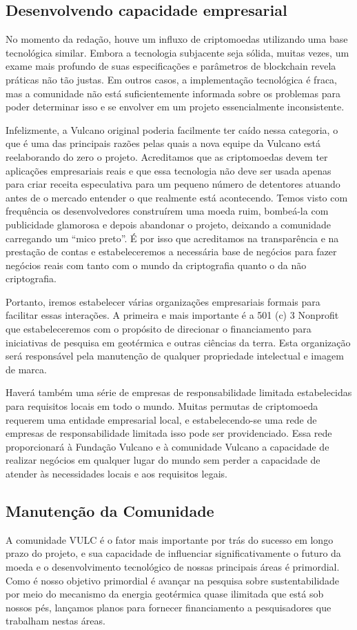 \documentclass[A4paper, 12pt]{article}
\begin{document}
\subsection{Desenvolvendo capacidade empresarial}
No momento da redação, houve um influxo de criptomoedas utilizando uma base tecnológica similar.  Embora a tecnologia subjacente seja sólida, muitas vezes, um exame mais profundo de suas especificações e parâmetros de blockchain revela práticas não tão justas.  Em outros casos, a implementação tecnológica é fraca, mas a comunidade não está suficientemente informada sobre os problemas para poder determinar isso e se envolver em um projeto essencialmente inconsistente.

Infelizmente, a Vulcano original poderia facilmente ter caído nessa categoria, o que é uma das principais razões pelas quais a nova equipe da Vulcano está reelaborando do zero o projeto. Acreditamos que as criptomoedas devem ter aplicações empresariais reais e que essa tecnologia não deve ser usada apenas para criar receita especulativa para um pequeno número de detentores atuando antes de o mercado entender o que realmente está acontecendo. Temos visto com frequência os desenvolvedores construírem uma moeda ruim, bombeá-la com publicidade glamorosa e depois abandonar o projeto, deixando a comunidade carregando um “mico preto”. É por isso que acreditamos na transparência e na prestação de contas e estabeleceremos a necessária base de negócios para fazer negócios reais com tanto com o mundo da criptografia quanto o da não criptografia.

Portanto, iremos estabelecer várias organizações empresariais formais para facilitar essas interações. A primeira e mais importante é a 501 (c) 3 Nonprofit que estabeleceremos com o propósito de direcionar o financiamento para iniciativas de pesquisa em geotérmica e outras ciências da terra. Esta organização será responsável pela manutenção de qualquer  propriedade intelectual e imagem de marca.

Haverá também uma série de empresas de responsabilidade limitada estabelecidas para requisitos locais em todo o mundo. Muitas permutas de criptomoeda requerem uma entidade empresarial local, e estabelecendo-se uma rede de empresas de responsabilidade limitada isso pode ser providenciado. Essa rede proporcionará à Fundação Vulcano e à comunidade Vulcano a capacidade de realizar negócios em qualquer lugar do mundo sem perder a capacidade de atender às necessidades locais e aos requisitos legais.

\subsection{Manutenção da Comunidade}
A comunidade VULC é o fator mais importante por trás do sucesso em longo prazo do projeto, e sua capacidade de influenciar significativamente o futuro da moeda e o desenvolvimento tecnológico de nossas principais áreas é primordial. Como é nosso objetivo primordial é avançar na pesquisa sobre sustentabilidade por meio do mecanismo da energia geotérmica quase ilimitada que está sob nossos pés, lançamos planos para fornecer financiamento a pesquisadores que trabalham nestas áreas.
\end{document}

